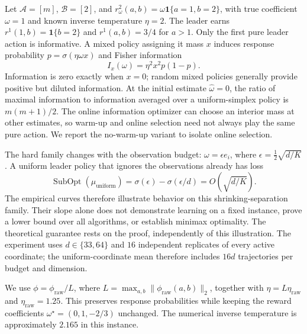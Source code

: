 Let $\mathcal A=[m]$, $\mathcal B=[2]$, and
$r^2_\omega(a,b)=\omega\mathbf{1}\{a=1,b=2\}$, with true coefficient $\omega=1$
and known inverse temperature $\eta=2$. The leader earns
$r^1(1,b)=\mathbf{1}\{b=2\}$ and $r^1(a,b)=3/4$ for $a>1$.
Only the first pure leader action is informative. A mixed policy assigning it
mass $x$ induces response probability $p=\sigma(\eta\omega x)$ and Fisher information
\begin{equation*}
I_x(\omega)=\eta^2x^2p(1-p).
\end{equation*}
Information is zero exactly when $x=0$; random mixed policies generally provide
positive but diluted information. At the initial estimate $\hat\omega=0$, the
ratio of maximal information to information averaged over a uniform-simplex
policy is $m(m+1)/2$. The online information optimizer can choose an interior
mass at other estimates, so warm-up and online selection need not always play
the same pure action. We report the no-warm-up variant to isolate online selection.

The hard family changes with the observation budget:
$\omega=\epsilon e_i$, where $\epsilon=\tfrac12\sqrt{d/K}$.
A uniform leader policy that ignores the observations already has loss
\begin{equation*}
\operatorname{SubOpt}(\mu_{\mathrm{uniform}})=\sigma(\epsilon)-\sigma(\epsilon/d)=O(\sqrt{d/K}).
\end{equation*}
The empirical curves therefore illustrate behavior on this shrinking-separation
family. Their slope alone does not demonstrate learning on a fixed instance,
prove a lower bound over all algorithms, or establish minimax optimality.
The theoretical guarantee rests on the proof, independently of this illustration.
The experiment uses $d\in\{33,64\}$ and $16$ independent replicates of every active
coordinate; the uniform-coordinate mean therefore includes $16d$ trajectories
per budget and dimension.

We use $\phi=\phi_{\mathrm{raw}}/L$, where
$L=\max_{a,b}\lVert\phi_{\mathrm{raw}}(a,b)\rVert_2$, together with
$\eta=L\eta_{\mathrm{raw}}$ and $\eta_{\mathrm{raw}}=1.25$.
This preserves response probabilities while keeping the reward coefficients
$\omega^\star=(0,1,-2/3)$ unchanged. The numerical inverse temperature is
approximately $2.165$ in this instance.

